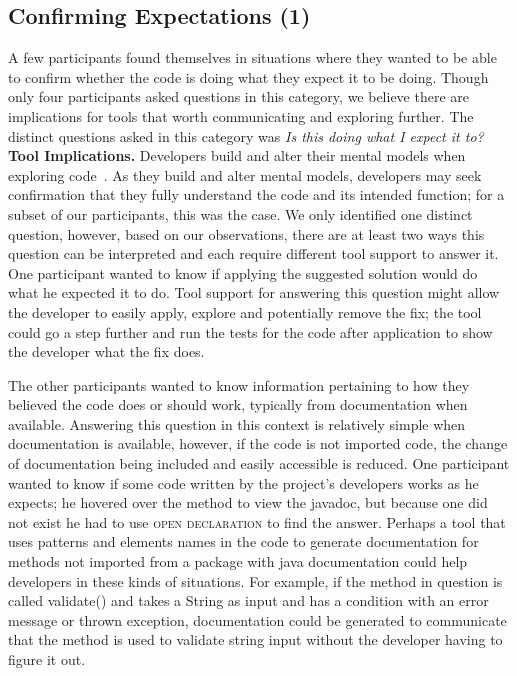 \documentclass[conference]{IEEEtran}
\begin{document}

\noindent\subsection{\textbf{Confirming Expectations (1)}}\label{ce}

A few participants found themselves in situations where they wanted to be able to confirm whether the code is doing what they expect it to be doing. 
Though only four participants asked questions in this category, we believe there are implications for tools that worth communicating and exploring further. 
The distinct questions asked in this category was \textit{Is this doing what I expect it to?} 
\\

\noindent\textbf{Tool Implications.} Developers build and alter their mental models when exploring code~\cite{canas1994mental, burkhardt1997mental}. 
As they build and alter mental models, developers may seek confirmation that they fully understand the code and its intended function; for a subset of our participants, this was the case. 
We only identified one distinct question, however, based on our observations, there are at least two ways this question can be interpreted and each require different tool support to answer it.
One participant wanted to know if applying the suggested solution would do what he expected it to do. 
Tool support for answering this question might allow the developer to easily apply, explore and potentially remove the fix; the tool could go a step further and run the tests for the code after application to show the developer what the fix does.

The other participants wanted to know information pertaining to how they believed the code does or should work, typically from documentation when available. 
Answering this question in this context is relatively simple when documentation is available, however, if the code is not imported code, the change of documentation being included and easily accessible is reduced.
One participant wanted to know if some code written by the project's developers works as he expects; he hovered over the method to view the javadoc, but because one did not exist he had to use \textsc{open declaration} to find the answer.
Perhaps a tool that uses patterns and elements names in the code to generate documentation for methods not imported from a package with java documentation could help developers in these kinds of situations.
For example, if the method in question is called validate() and takes a String as input and has a condition with an error message or thrown exception, documentation could be generated to communicate that the method is used to validate string input without the developer having to figure it out.
\end{document}
